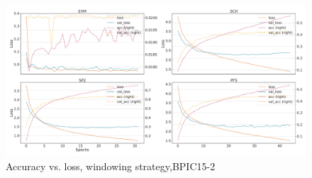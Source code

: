 \begin{figure}[!htb]
    \centering
    \includegraphics[width=\textwidth]{gfx/bpic2015_2/windowed_loss_acc_curve.pdf}
    \caption{Accuracy vs. loss, windowing strategy,BPIC15-2}
\end{figure}
\FloatBarrier

